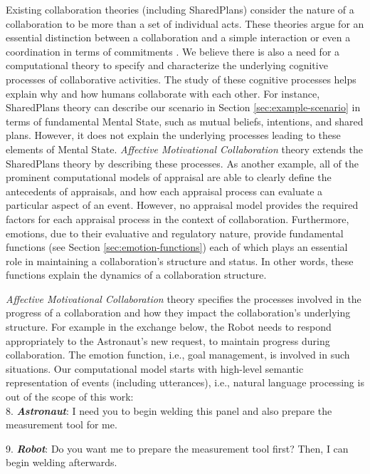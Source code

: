 \documentclass[12pt]{report}
\begin{document}
Existing collaboration theories (including SharedPlans) consider the nature of a
collaboration to be more than a set of individual acts. These theories argue for
an essential distinction between a collaboration and a simple interaction or
even a coordination in terms of commitments \cite{grosz:shared-plans,
lochbaum:collaborative-planning}. We believe there is also a need for a
computational theory to specify and characterize the underlying cognitive
processes of collaborative activities. The study of these cognitive processes
helps explain why and how humans collaborate with each other. For instance,
SharedPlans theory can describe our scenario in Section
\ref{sec:example-scenario} in terms of fundamental Mental State, such as mutual
beliefs, intentions, and shared plans. However, it does not explain the
underlying processes leading to these elements of Mental State.
\textit{Affective Motivational Collaboration} theory extends the SharedPlans
theory by describing these processes. {\color{red}As another example, all of the
prominent computational models of appraisal are able to clearly define the
antecedents of appraisals, and how each appraisal process can evaluate a
particular aspect of an event. However, no appraisal model provides the required
factors for each appraisal process in the context of collaboration.}
Furthermore, emotions, due to their evaluative and regulatory nature, provide
fundamental functions (see Section \ref{sec:emotion-functions}) each of which
plays an essential role in maintaining a collaboration's structure and status.
In other words, these functions explain the dynamics of a collaboration
structure.

\textit{Affective Motivational Collaboration} theory specifies the processes
involved in the progress of a collaboration and how they impact the
collaboration's underlying structure. For example in the exchange below, the
Robot needs to respond appropriately to the Astronaut's new request, to maintain
progress during collaboration. The emotion function, i.e., goal management, is
involved in such situations. {\color{red}Our computational model starts with
high-level semantic representation of events (including utterances), i.e.,
natural language processing is out of the scope of this work:}\\

  8. \textbf{\textit{Astronaut}}: I need you to begin welding this panel and also
  prepare the measurement tool for me.

  9. \textbf{\textit{Robot}}: Do you want me to prepare the measurement tool
  first? Then, I can begin welding afterwards.\\
\end{document}

